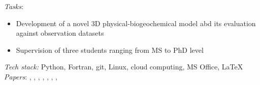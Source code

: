 \documentclass[
	a4paper,
]{fortysecondscv}
\begin{document}
\begin{cvtable}[1.0]
	{\href{https://www.hereon.de/}{\color{pblue}{Helmholtz-Zentrum Hereon, Germany}}}
	{\textit{Tasks}:
	\begin{itemize}[topsep=0pt,itemsep=0pt,partopsep=0pt, parsep=0pt, leftmargin=*]
     \item Development of a novel 3D physical-biogeochemical model abd its evaluation against observation datasets
     \item Supervision of three students ranging from MS to PhD level
    \end{itemize}
      \textit{Tech stack:} Python, Fortran, git, Linux, cloud computing, MS Office, \LaTeX \\
      \textit{Papers}:
      \href{https://doi.org/10.3389/fevo.2016.00131}{\color{pblue}{1}}, %
      \href{https://doi.org/10.5194/bg-14-4499-2017}{\color{pblue}{2}}, %
      \href{https://doi.org/10.1016/j.ecolmodel.2017.07.008}{\color{pblue}{3}}, %
      \href{https://doi.org/10.5194/gmd-11-915-2018}{\color{pblue}{4}}, %
      \href{https://doi.org/10.1016/j.ecss.2017.11.002}{\color{pblue}{5}}, %
      \href{https://doi.org/10.1007/s10750-018-3653-5}{\color{pblue}{6}}, %
      \href{https://doi.org/10.1016/j.scitotenv.2018.05.215}{\color{pblue}{7}}, %
      \href{https://doi.org/10.3389/fmars.2019.00370}{\color{pblue}{8}} %
      }


\end{cvtable}
\end{document}
